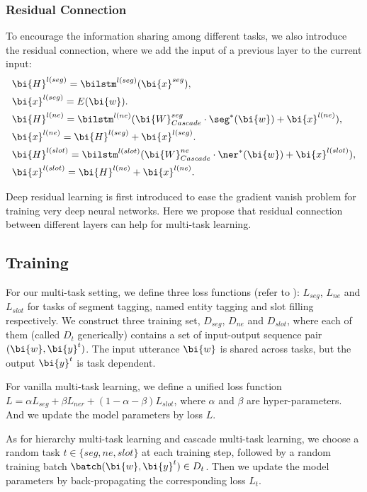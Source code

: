 \subsubsection{Residual Connection}
To encourage the information sharing among different tasks,
we also introduce the residual connection,
where we add the input of a previous layer to the current input:
\begin{eqnarray*}
	& \bi{H}^{l(seg)}=\bilstm^{l(seg)}(\bi{x}^{seg}), \\
	& \bi{x}^{l(seg)}=E(\bi{w}). \\
	& \bi{H}^{l(ne)}= \bilstm^{l(ne)}(\bi{W}_{Cascade}^{seg}\cdot \seg^*(\bi{w})+\bi{x}^{l(ne)}), \\
	& \bi{x}^{l(ne)}= \bi{H}^{l(seg)}+\bi{x}^{l(seg)}. \\
	& \bi{H}^{l(slot)}= \bilstm^{l(slot)}(\bi{W}_{Cascade}^{ne}\cdot \ner^*(\bi{w})+\bi{x}^{l(slot)}), \\
	& \bi{x}^{l(slot)}= \bi{H}^{l(ne)}+\bi{x}^{l(ne)}.
\end{eqnarray*}

Deep residual learning \cite{he2016deep} is first introduced to ease the gradient vanish problem for training very deep neural networks.
Here we propose that residual connection between different layers can help for multi-task learning.

\subsection{Training}
\label{sec:training}
For our multi-task setting, 
we define three loss functions (refer to ):
$L_{seg}$, $L_{ne}$ and $L_{slot}$ for tasks of segment tagging, named entity tagging 
and slot filling respectively.
We construct three training set,
$D_{seg}$, $D_{ne}$ and $D_{slot}$,
where each of them (called $D_t$ generically) contains a set of 
input-output sequence pair $(\bi{w}, \bi{y}^t)$.
The input utterance $\bi{w}$ is shared across tasks, but the output $\bi{y}^t$ is task dependent.

For vanilla multi-task learning,
we define a unified loss function $L=\alpha L_{seg}+\beta L_{ner}+(1-\alpha-\beta)L_{slot}$, 
where $\alpha$ and $\beta$ are hyper-parameters.
And we update the model parameters by loss $L$.

As for hierarchy multi-task learning and cascade multi-task learning,
we choose a random task $t \in \{seg, ne, slot\}$ at each training step,
followed by a random training batch $\batch(\bi{w}, \bi{y}^t) \in D_t$.
Then we update the model parameters by back-propagating
the corresponding loss $L_t$.
